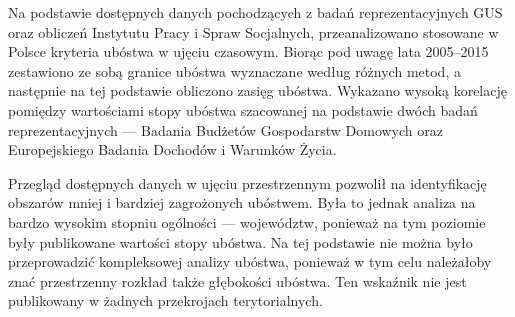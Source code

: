 Na podstawie dostępnych danych pochodzących z badań reprezentacyjnych GUS oraz obliczeń Instytutu Pracy i Spraw Socjalnych, przeanalizowano stosowane w Polsce kryteria ubóstwa w ujęciu czasowym. Biorąc pod uwagę lata 2005--2015 zestawiono ze sobą granice ubóstwa wyznaczane według różnych metod, a następnie na tej podstawie obliczono zasięg ubóstwa. Wykazano wysoką korelację pomiędzy wartościami stopy ubóstwa szacowanej na podstawie dwóch badań reprezentacyjnych --- Badania Budżetów Gospodarstw Domowych oraz Europejskiego Badania Dochodów i Warunków Życia.

Przegląd dostępnych danych w ujęciu przestrzennym pozwolił na identyfikację obszarów mniej i bardziej zagrożonych ubóstwem. Była to jednak analiza na bardzo wysokim stopniu ogólności --- województw, ponieważ na tym poziomie były publikowane wartości stopy ubóstwa. Na tej podstawie nie można było przeprowadzić kompleksowej analizy ubóstwa, ponieważ w tym celu należałoby znać przestrzenny rozkład także głębokości ubóstwa. Ten wskaźnik nie jest publikowany w żadnych przekrojach terytorialnych. 
